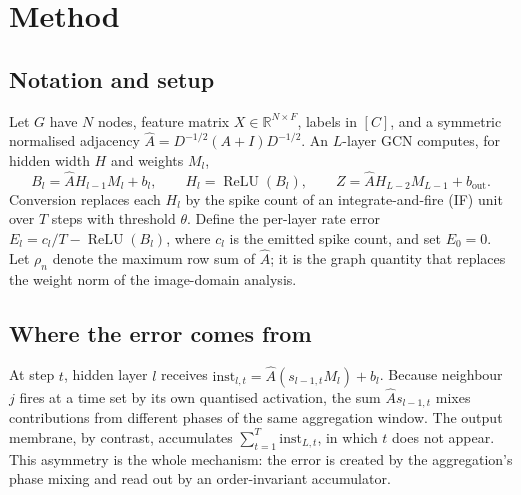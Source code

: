 \documentclass[10pt,twocolumn]{article}
\newcommand{\Ahat}{\hat{A}}
\newcommand{\Emat}{E}
\newcommand{\relu}{\operatorname{ReLU}}
\newcommand{\nclass}{C}
\newcommand{\hdim}{H}
\newcommand{\rhon}{\rho_n}
\begin{document}
\section{Method}
\label{sec:method}

\subsection{Notation and setup}
Let $G$ have $N$ nodes, feature matrix $X\in\mathbb{R}^{N\times F}$, labels in
$[\nclass]$, and a symmetric normalised adjacency $\Ahat=D^{-1/2}(A+I)D^{-1/2}$.
An $L$-layer GCN computes, for hidden width $\hdim$ and weights $M_l$,
\begin{equation}
B_l = \Ahat H_{l-1} M_l + b_l,\qquad H_l=\relu(B_l),\qquad
Z = \Ahat H_{L-2}M_{L-1}+b_{\mathrm{out}} .
\end{equation}
Conversion replaces each $H_l$ by the spike count of an integrate-and-fire (IF) unit over
$T$ steps with threshold $\theta$. Define the per-layer rate error
$\Emat_l = c_l/T-\relu(B_l)$, where $c_l$ is the emitted spike count, and set $\Emat_0=0$.
Let $\rhon$ denote the maximum row sum of $\Ahat$; it is the graph quantity that replaces the
weight norm of the image-domain analysis.

\subsection{Where the error comes from}
At step $t$, hidden layer $l$ receives
$\mathrm{inst}_{l,t}=\Ahat(s_{l-1,t}M_l)+b_l$. Because neighbour $j$ fires at a time set by its
own quantised activation, the sum $\Ahat s_{l-1,t}$ mixes contributions from different phases of
the same aggregation window. The output membrane, by contrast, accumulates
$\sum_{t=1}^{T}\mathrm{inst}_{L,t}$, in which $t$ does not appear. This asymmetry is the whole
mechanism: the error is created by the aggregation's phase mixing and read out by an
order-invariant accumulator.
\end{document}

